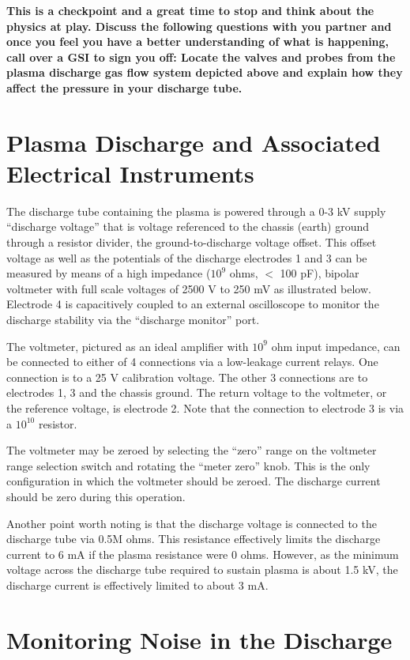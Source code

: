 \documentclass{../lab}
\begin{document}
\textbf{This is a checkpoint and a great time to stop and think about the physics at play. Discuss the following questions with you partner and once you feel you have a better understanding of what is happening, call over a GSI to sign you off:
Locate the valves and probes from the plasma discharge gas flow system depicted above and explain how they affect the pressure in your discharge tube.}

\section{Plasma Discharge and Associated Electrical Instruments}

The discharge tube containing the plasma is powered through a 0-3 kV supply ``discharge voltage'' that is voltage referenced to the chassis (earth) ground through a resistor divider, the ground-to-discharge voltage offset. This offset voltage as well as the potentials of the discharge electrodes 1 and 3 can be measured by means of a high impedance ($10^9$ ohms, $<$ 100 pF), bipolar voltmeter with full scale voltages of 2500 V to 250 mV as illustrated below. Electrode 4 is capacitively coupled to an external oscilloscope to monitor the discharge stability via the ``discharge monitor'' port.

The voltmeter, pictured as an ideal amplifier with $10^9$ ohm input impedance, can be connected to either of 4 connections via a low-leakage current relays. One connection is to a 25 V calibration voltage. The other 3 connections are to electrodes 1, 3 and the chassis ground. The return voltage to the voltmeter, or the reference voltage, is electrode 2. Note that the connection to electrode 3 is via a $10^{10}$ resistor.

The voltmeter may be zeroed by selecting the ``zero'' range on the voltmeter range selection switch and rotating the ``meter zero'' knob. This is the only configuration in which the voltmeter should be zeroed. The discharge current should be zero during this operation.

Another point worth noting is that the discharge voltage is connected to the discharge tube via 0.5M ohms. This resistance effectively limits the discharge current to 6 mA if the plasma resistance were 0 ohms. However, as the minimum voltage across the discharge tube required to sustain plasma is about 1.5 kV, the discharge current is effectively limited to about 3 mA.

\section{Monitoring Noise in the Discharge}
\end{document}
